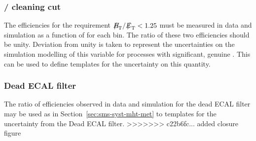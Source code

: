 \subsubsection{\texorpdfstring{\mht/\met}{MHT/MET} cleaning cut\label{sec:sms-syst-mht-met}}
The efficiencies for the requirement $\mht/\met < 1.25$ must be measured in 
data and simulation as a function of \mht for each \scalht bin.
The ratio of these two efficiencies should be unity. Deviation from unity is taken
to represent the uncertainties on the simulation modelling of this
variable for processes with significant, genuine \met. This can be used
to define templates for the uncertainty on this quantity.

\subsubsection{Dead ECAL filter\label{sec:sms-syst-dead-ecal}}

The ratio of efficiencies observed in data and simulation for the dead
ECAL filter may be used as in Section~\ref{sec:sms-syst-mht-met} to templates
for the uncertainty from the Dead ECAL filter. 
>>>>>>> c22b6fc... added closure figure
